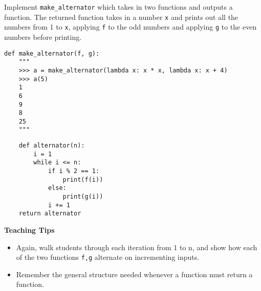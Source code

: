 \begin{blocksection}
\question Implement \lstinline$make_alternator$ which takes in two functions and outputs a function. The returned function takes in a number \texttt{x} and prints out all the numbers from 1 to \texttt{x}, applying \texttt{f} to the odd numbers and applying \texttt{g} to the even numbers before printing.

\begin{lstlisting}
def make_alternator(f, g):
    """
    >>> a = make_alternator(lambda x: x * x, lambda x: x + 4)
    >>> a(5)
    1
    6
    9
    8
    25
    """
\end{lstlisting}

\begin{solution}[1.5in]
\begin{lstlisting}
    def alternator(n):
        i = 1
        while i <= n:
            if i % 2 == 1:
                print(f(i))
            else:
                print(g(i))
            i += 1
    return alternator
\end{lstlisting}
\end{solution}

\begin{blocksection}
 \begin{guide}
   \textbf{Teaching Tips}
   \begin{itemize}
   	   \item Again, walk students through each iteration from 1 to n, and show how each of the two functions \verb|f,g| alternate on incrementing inputs. 
   	   \item Remember the general structure needed whenever a function must return a function. 
   \end{itemize}
 \end{guide}
\end{blocksection}

\end{blocksection}
